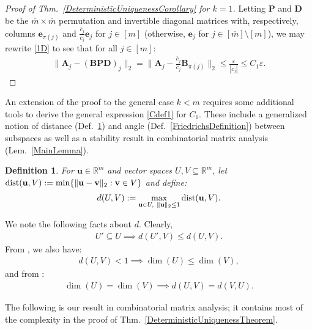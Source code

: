 \documentclass[journal, twocolumn]{IEEEtran}
\newtheorem{definition}{Definition}
\begin{document}
\begin{proof}[Proof of Thm.~\ref{DeterministicUniquenessCorollary} for $k=1$]
Letting $\mathbf{P}$ and $\mathbf{D}$ be the $\overline m \times \overline m$ permutation and invertible diagonal matrices with, respectively, columns $\mathbf{e}_{\pi(j)}$ and $\frac{\overline{c}_j}{c_j}\mathbf{e}_j$ for $j \in [m]$ (otherwise, $\mathbf{e}_{j}$ for $j \in [\overline{m}] \setminus [m]$), we may rewrite \eqref{1D} to see that for all $j \in [m]$:
\begin{align*}
\|\mathbf{A}_j - (\mathbf{BPD})_j\|_2 
= \|\mathbf{A}_j - \frac{\overline{c}_j}{c_j}\mathbf{B}_{\pi(j)}\|_2 
\leq \frac{\varepsilon}{|c_j|} 
\leq C_1\varepsilon.
\end{align*}
\end{proof}

An extension of the proof to the general case $k < m$ requires some additional tools to derive the general expression \eqref{Cdef1} for $C_1$. These include a generalized notion of distance (Def.~\ref{dDef}) and angle (Def.~\ref{FriedrichsDefinition}) between subspaces as well as a stability result in combinatorial matrix analysis (Lem.~\ref{MainLemma}). 

\begin{definition}\label{dDef}
For $\mathbf{u} \in \mathbb R^m$ and vector spaces $U,V \subseteq \mathbb{R}^m$, let $\text{\rm dist}(\mathbf{u}, V) := \min \{\| \mathbf{u}-\mathbf{v} \|_2: \mathbf{v} \in V\}$ and define:
\begin{align}
d(U,V) := \max_{\mathbf{u} \in U, \ \|\mathbf{u}\|_2 \leq 1} \text{\rm dist}(\mathbf{u},V).
\end{align}
\end{definition}

We note the following facts about $d$. Clearly, 
\begin{align}\label{UsubU}
U' \subseteq U \implies d(U',V) \leq d(U,V).
\end{align}
From \cite[Ch.~4 Cor.~2.6]{Kato2013}, we also have: %
\begin{align}\label{dimLem}
d(U,V) < 1 \implies \dim(U) \leq \dim(V),
\end{align}
and from \cite[Lem.~3.2]{Morris10}:
\begin{align}\label{eqdim}
\dim(U) = \dim(V) \implies d(U,V) = d(V,U).
\end{align}

The following is our result in combinatorial matrix analysis; it contains most of the complexity in the proof of Thm.~\ref{DeterministicUniquenessTheorem}. 
\end{document}

